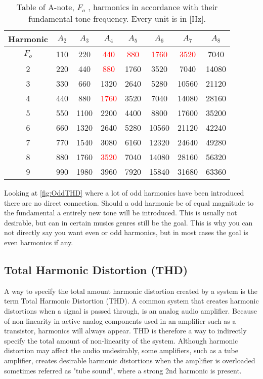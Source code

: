 \begin{table}[H]
\centering
{}
\begin{tabular}{S[table-format=1]ccccccc} \toprule
    {Harmonic} & {$A_2$} & {$A_3$} & {$A_4$} & {$A_5$} & {$A_6$} & {$A_7$} & {$A_8$} \\ \midrule 
    $F_o$  & 110  & 220  & \textcolor{red}{440}   & \textcolor{red}{880}  & \textcolor{red}{1760}  & \textcolor{red}{3520}   & 7040   \\       & 220  & 440  & \textcolor{red}{880}   & 1760 & 3520   & 7040   & 14080  \\ 
    3      & 330  & 660  & 1320  & 2640 & 5280   & 10560  & 21120  \\
    4      & 440  & 880  & \textcolor{red}{1760}  & 3520 & 7040   & 14080  & 28160  \\ 
    5      & 550  & 1100 & 2200  & 4400 & 8800   & 17600  & 35200  \\       & 660  & 1320 & 2640  & 5280 & 10560  & 21120  & 42240  \\
    7      & 770  & 1540 & 3080  & 6160 & 12320  & 24640  & 49280  \\
    8      & 880  & 1760 & \textcolor{red}{3520}  & 7040 & 14080  & 28160  & 56320  \\ 
    9      & 990  & 1980 & 3960  & 7920 & 15840  & 31680  & 63360  \\ \bottomrule
\end{tabular}
\caption{Table of A-note, $F_o$ , harmonics in accordance with their fundamental tone frequency. Every unit is in [Hz].\citep{sou:NoteA}}
\label{tab:NoteA4}
\end{table}

Looking at \autoref{fig:OddTHD} where a lot of odd harmonics have been introduced there are no direct connection. Should a odd harmonic be of equal magnitude to the fundamental a entirely  new tone will be introduced. This is usually not desirable, but can in certain musics genres still be the goal. This is why you can not directly say you want even or odd harmonics, but in most cases the goal is even harmonics if any.

\subsection{Total Harmonic Distortion (THD)}

A way to specify the total amount harmonic distortion created by a system is  the term Total Harmonic Distortion (THD). A common system that creates harmonic distortions when a signal is passed through, is an analog audio amplifier. Because of non-linearity in active analog components used in an amplifier such as a transistor, harmonics will always appear. THD is therefore a way to indirectly specify the total amount of non-linearity of the system. Although harmonic distortion may affect the audio undesirably, some amplifiers, such as a tube amplifier, creates desirable harmonic distortions when the amplifier is overloaded sometimes referred as "tube sound", where a strong 2nd harmonic is present. 

